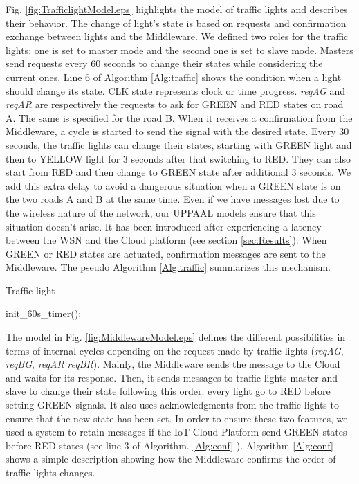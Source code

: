 Fig.
\ref{fig:TrafficlightModel.eps} highlights the model of traffic lights and describes their behavior.
The change of light's state is based on requests and confirmation exchange between lights and the Middleware.
We defined two roles for the traffic lights:
	one is set to master mode and the second one is set to slave mode.
Masters send requests every 60 seconds to change their states while considering the current ones.
Line 6 of Algorithm \ref{Alg:traffic} shows the condition when a light should change its state.
CLK state represents clock or time progress.
\emph{reqAG} and \emph{reqAR} are respectively the requests to ask for GREEN and RED states on road A.
The same is specified for the road B.
When it receives a confirmation from the Middleware,
	a cycle is started to send the signal with the desired state.
Every 30 seconds,
	the traffic lights can change their states,
	starting with GREEN light and then to YELLOW light for 3 seconds after that switching to RED.
They can also start from RED and then change to GREEN state after additional 3 seconds.
We add this extra delay to avoid a dangerous situation when a GREEN state is on the two roads A and B at the same time.
Even if we have messages lost due to the wireless nature of the network,
	our UPPAAL models ensure that this situation doesn't arise.
It has been introduced after experiencing a latency between the WSN and the Cloud platform (see section \ref{sec:Results}).
When GREEN or RED states are actuated,
	confirmation messages are sent to the Middleware.
The pseudo Algorithm \ref{Alg:traffic} summarizes this mechanism.

\LinesNumbered \begin{algorithm}[ht] \caption{Traffic light\label{Alg:traffic}}
init\_60s\_timer();
\end{algorithm}

The model in Fig.
\ref{fig:MiddlewareModel.eps} defines the different possibilities in terms of internal cycles depending on the request made by traffic lights (\emph{reqAG},
	\emph{reqBG},
	\emph{reqAR} \emph{reqBR}).
Mainly,
	the Middleware sends the message to the Cloud and waits for its response.
Then,
	it sends messages to traffic lights master and slave to change their state following this order:
	every light go to RED before setting GREEN signals.
It also uses acknowledgments from the traffic lights to ensure that the new state has been set.
In order to ensure these two features,
	we used a system to retain messages if the IoT Cloud Platform send GREEN states before RED states (see line 3 of Algorithm.
\ref{Alg:conf} ).
Algorithm \ref{Alg:conf} shows a simple description showing how the Middleware confirms the order of traffic lights changes.


